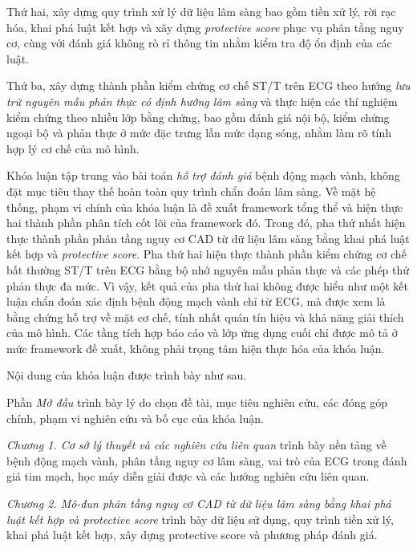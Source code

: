 Thứ hai, xây dựng quy trình xử lý dữ liệu lâm sàng bao gồm tiền xử lý, rời rạc hóa, khai phá luật kết hợp và xây dựng \textit{protective score} phục vụ phân tầng nguy cơ, cùng với đánh giá không rò rỉ thông tin nhằm kiểm tra độ ổn định của các luật.

Thứ ba, xây dựng thành phần kiểm chứng cơ chế ST/T trên ECG theo hướng \textit{lưu trữ nguyên mẫu phản thực có định hướng lâm sàng} và thực hiện các thí nghiệm kiểm chứng theo nhiều lớp bằng chứng, bao gồm đánh giá nội bộ, kiểm chứng ngoại bộ và phản thực ở mức đặc trưng lẫn mức dạng sóng, nhằm làm rõ tính hợp lý cơ chế của mô hình.

\blocksep
{}
\blocksep

Khóa luận tập trung vào bài toán \textit{hỗ trợ đánh giá} bệnh động mạch vành, không đặt mục tiêu thay thế hoàn toàn quy trình chẩn đoán lâm sàng. Về mặt hệ thống, phạm vi chính của khóa luận là đề xuất framework tổng thể và hiện thực hai thành phần phân tích cốt lõi của framework đó. Trong đó, pha thứ nhất hiện thực thành phần phân tầng nguy cơ CAD từ dữ liệu lâm sàng bằng khai phá luật kết hợp và \textit{protective score}. Pha thứ hai hiện thực thành phần kiểm chứng cơ chế bất thường ST/T trên ECG bằng bộ nhớ nguyên mẫu phản thực và các phép thử phản thực đa mức. Vì vậy, kết quả của pha thứ hai không được hiểu như một kết luận chẩn đoán xác định bệnh động mạch vành chỉ từ ECG, mà được xem là bằng chứng hỗ trợ về mặt cơ chế, tính nhất quán tín hiệu và khả năng giải thích của mô hình. Các tầng tích hợp báo cáo và lớp ứng dụng cuối chỉ được mô tả ở mức framework đề xuất, không phải trọng tâm hiện thực hóa của khóa luận.

\blocksep
{}
\blocksep

Nội dung của khóa luận được trình bày như sau.

Phần \textit{Mở đầu} trình bày lý do chọn đề tài, mục tiêu nghiên cứu, các đóng góp chính, phạm vi nghiên cứu và bố cục của khóa luận.

\textit{Chương 1. Cơ sở lý thuyết và các nghiên cứu liên quan} trình bày nền tảng về bệnh động mạch vành, phân tầng nguy cơ lâm sàng, vai trò của ECG trong đánh giá tim mạch, học máy diễn giải được và các hướng nghiên cứu liên quan.

\textit{Chương 2. Mô-đun phân tầng nguy cơ CAD từ dữ liệu lâm sàng bằng khai phá luật kết hợp và protective score} trình bày dữ liệu sử dụng, quy trình tiền xử lý, khai phá luật kết hợp, xây dựng protective score và phương pháp đánh giá.

